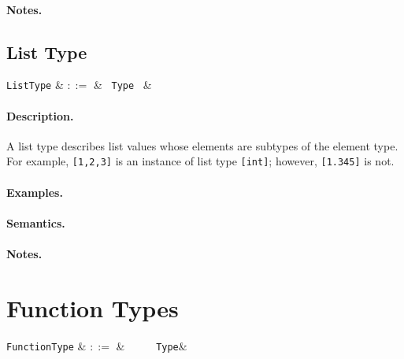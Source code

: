 \paragraph{Notes.} 


\subsection{List Type}

\begin{syntax}
  \verb+ListType+ & $::=$ & \token{[} \ \verb+Type+ \ \token{]}&\\
\end{syntax}

\paragraph{Description.}  A list type describes list values whose
elements are subtypes of the element type. For example,
\lstinline{[1,2,3]} is an instance of list type \lstinline{[int]}; however, \lstinline{[1.345]} is not.

\paragraph{Examples.}

\paragraph{Semantics.}

\paragraph{Notes.} 


\section{Function Types}

\begin{syntax}
  \verb+FunctionType+ & $::=$ & \ \token{(}\
  \ \token{)}\ \token{=>}\ \verb+Type+&\\
\end{syntax}

